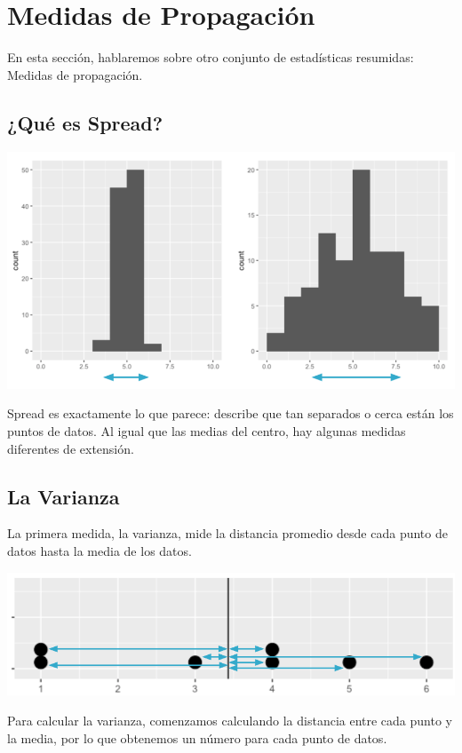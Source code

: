 \documentclass[
  letterpaper,
  DIV=11,
  numbers=noendperiod]{scrreprt}
\begin{document}
\hypertarget{medidas-de-propagaciuxf3n}{%
\section{Medidas de Propagación}\label{medidas-de-propagaciuxf3n}}

En esta sección, hablaremos sobre otro conjunto de estadísticas
resumidas: Medidas de propagación.

\hypertarget{quuxe9-es-spread}{%
\subsection{¿Qué es Spread?}\label{quuxe9-es-spread}}

\includegraphics{fig8.png}

Spread es exactamente lo que parece: describe que tan separados o cerca
están los puntos de datos. Al igual que las medias del centro, hay
algunas medidas diferentes de extensión.

\hypertarget{la-varianza}{%
\subsection{La Varianza}\label{la-varianza}}

La primera medida, la varianza, mide la distancia promedio desde cada
punto de datos hasta la media de los datos.

\includegraphics{fig9.png}

Para calcular la varianza, comenzamos calculando la distancia entre cada
punto y la media, por lo que obtenemos un número para cada punto de
datos.
\end{document}
